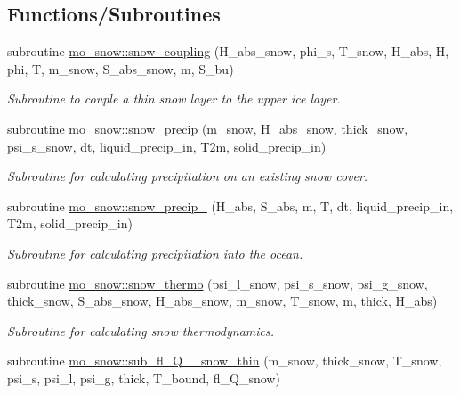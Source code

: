 \subsection*{Functions/Subroutines}
\begin{DoxyCompactItemize}
\item 
subroutine \hyperlink{namespacemo__snow_a846b1d8e0ce528570ee66f641db97eef}{mo\_\-snow::snow\_\-coupling} (H\_\-abs\_\-snow, phi\_\-s, T\_\-snow, H\_\-abs, H, phi, T, m\_\-snow, S\_\-abs\_\-snow, m, S\_\-bu)
\begin{DoxyCompactList}\small\item\em Subroutine to couple a thin snow layer to the upper ice layer. \item\end{DoxyCompactList}\item 
subroutine \hyperlink{namespacemo__snow_a39b7e4b579b1dfddc8555bfcd57b5397}{mo\_\-snow::snow\_\-precip} (m\_\-snow, H\_\-abs\_\-snow, thick\_\-snow, psi\_\-s\_\-snow, dt, liquid\_\-precip\_\-in, T2m, solid\_\-precip\_\-in)
\begin{DoxyCompactList}\small\item\em Subroutine for calculating precipitation on an existing snow cover. \item\end{DoxyCompactList}\item 
subroutine \hyperlink{namespacemo__snow_a4c98864b01acc61ff6b6ef62c9c79fa6}{mo\_\-snow::snow\_\-precip\_} (H\_\-abs, S\_\-abs, m, T, dt, liquid\_\-precip\_\-in, T2m, solid\_\-precip\_\-in)
\begin{DoxyCompactList}\small\item\em Subroutine for calculating precipitation into the ocean. \item\end{DoxyCompactList}\item 
subroutine \hyperlink{namespacemo__snow_a72eb7157143136ae8ccba8de71c74a04}{mo\_\-snow::snow\_\-thermo} (psi\_\-l\_\-snow, psi\_\-s\_\-snow, psi\_\-g\_\-snow, thick\_\-snow, S\_\-abs\_\-snow, H\_\-abs\_\-snow, m\_\-snow, T\_\-snow, m, thick, H\_\-abs)
\begin{DoxyCompactList}\small\item\em Subroutine for calculating snow thermodynamics. \item\end{DoxyCompactList}\item 
subroutine \hyperlink{namespacemo__snow_ab464267664e63624ed508606189bd9a5}{mo\_\-snow::sub\_\-fl\_\-Q\_\_\-snow\_\-thin} (m\_\-snow, thick\_\-snow, T\_\-snow, psi\_\-s, psi\_\-l, psi\_\-g, thick, T\_\-bound, fl\_\-Q\_\-snow)

\end{DoxyCompactItemize}
